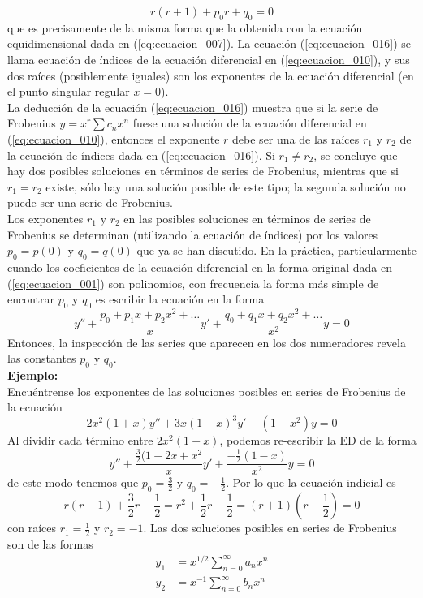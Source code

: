 \begin{equation}
r(r+1) + p_{0}r + q_{0} = 0
\label{eq:ecuacion_016}
\end{equation}
que es precisamente de la misma forma que la obtenida con la ecuación equidimensional dada en (\ref{eq:ecuacion_007}). La ecuación (\ref{eq:ecuacion_016}) se llama ecuación de índices de la ecuación diferencial en (\ref{eq:ecuacion_010}), y sus dos raíces (posiblemente iguales) son los exponentes de la ecuación diferencial (en el punto singular regular $x = 0$).
\\
La deducción de la ecuación (\ref{eq:ecuacion_016}) muestra que si la serie de Frobenius $y = x^{r} \sum c_{n} x^{n}$ fuese una solución de la ecuación diferencial en (\ref{eq:ecuacion_010}), entonces el exponente $r$ debe ser una de las raíces $r_{1}$ y $r_{2}$ de la ecuación de índices dada en (\ref{eq:ecuacion_016}). Si $r_{1} \neq r_{2}$, se concluye que hay dos posibles soluciones en términos de series de Frobenius, mientras que si $r_{1} = r_{2}$ existe, sólo hay una solución posible de este tipo; la segunda solución no puede ser una serie de Frobenius.
\\
Los exponentes $r_{1}$ y $r_{2}$ en las posibles soluciones en términos de series de Frobenius se determinan (utilizando la ecuación de índices) por los valores $p_{0} = p(0)$ y $q_{0} = q(0)$ que ya se han discutido. En la práctica, particularmente cuando los coeficientes de la ecuación diferencial en la forma original dada en (\ref{eq:ecuacion_001}) son polinomios, con frecuencia la forma más simple de encontrar $p_{0}$ y $q_{0}$ es escribir la ecuación en la forma
\begin{equation}
y'' + \dfrac{p_{0} + p_{1} x + p_{2} x^{2} + \ldots}{x} y' + \dfrac{q_{0} + q_{1} x + q_{2} x^{2} + \ldots}{x^{2}} y = 0
\label{eq:ecuacion_017}
\end{equation}
Entonces, la inspección de las series que aparecen en los dos numeradores revela las constantes $p_{0}$ y $q_{0}$.
\\
\textbf{Ejemplo:}
\\
Encuéntrense los exponentes de las soluciones posibles en series de Frobenius de la ecuación
\[ 2 x^{2} (1+x) y'' + 3x(1+x)^{3} y' - (1-x^{2}) y = 0 \]
Al dividir cada término entre $2x^{2}(1+x)$, podemos re-escribir la ED de la forma
\[ y'' + \dfrac{\frac{3}{2}(1 + 2x + x^{2}}{x} y' + \dfrac{-\frac{1}{2} (1-x)}{x^{2}} y = 0 \]
de este modo tenemos que $p_{0} = \frac{3}{2}$ y $q_{0} = - \frac{1}{2}$. Por lo que la ecuación indicial es
\[ r(r-1) + \frac{3}{2} r - \frac{1}{2} = r^{2} + \frac{1}{2} r - \frac{1}{2} = (r+1)(r-\frac{1}{2}) = 0 \]
con raíces $r_{1}=\frac{1}{2}$ y $r_{2} = -1$. Las dos soluciones posibles en series de Frobenius son de las formas
\begin{eqnarray*}
y_{1} &= x^{1/2} \sum_{n=0}^{\infty} a_{n} x^{n} \nonumber \\
y_{2} &= x^{-1} \sum_{n=0}^{\infty} b_{n} x^{n} \nonumber \\
\end{eqnarray*}
